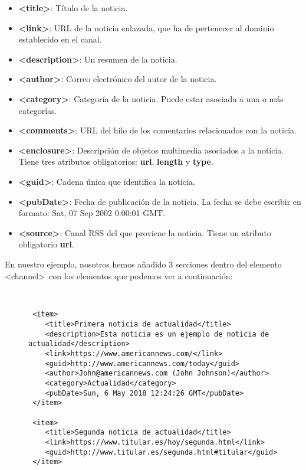 \begin{enumerate}
    \begin{itemize}
        \item \textbf{<title>}: Título de la noticia.
        \item \textbf{<link>}: URL de la noticia enlazada, que ha de pertenecer al dominio establecido en el canal.
        \item \textbf{<description>}: Un resumen de la noticia.
        \item \textbf{<author>}: Correo electrónico del autor de la noticia.
        \item \textbf{<category>}: Categoría de la noticia. Puede estar asociada a una o más categorías.
        \item \textbf{<comments>}: URL del hilo de los comentarios relacionados con la noticia.
        \item \textbf{<enclosure>}: Descripción de objetos multimedia asociados a la noticia. Tiene tres atributos obligatorios: \textbf{url}, \textbf{length} y \textbf{type}.
        \item \textbf{<guid>}: Cadena única que identifica la noticia.
        \item \textbf{<pubDate>}: Fecha de publicación de la noticia. La fecha se debe escribir en formato: Sat, 07 Sep 2002 0:00:01 GMT.
        \item \textbf{<source>}: Canal RSS del que proviene la noticia. Tiene un atributo obligatorio \textbf{url}.
    \end{itemize}

    En nuestro ejemplo, nosotros hemos añadido 3 secciones dentro del elemento <channel>\ con los elementos que podemos ver a continuación:

    \begin{figure}[h]
        \begin{tcolorbox}[sharp corners, colback=yellow!30, colframe=white!20]
            \scriptsize
            \begin{verbatim}


 <item>
    <title>Primera noticia de actualidad</title>
    <description>Esta noticia es un ejemplo de noticia de actualidad</description>
    <link>https://www.americannews.com/</link>
    <guid>http://www.americannews.com/today</guid>
    <author>John@americannews.com (John Johnson)</author>
    <category>Actualidad</category>
    <pubDate>Sun, 6 May 2018 12:24:26 GMT</pubDate>
 </item>

 <item>
    <title>Segunda noticia de actualidad</title>
    <link>https://www.titular.es/hoy/segunda.html</link>
    <guid>http://www.titular.es/segunda.html#titular</guid>
 </item>


\end{verbatim}
\end{tcolorbox}
\end{figure}
\end{enumerate}
